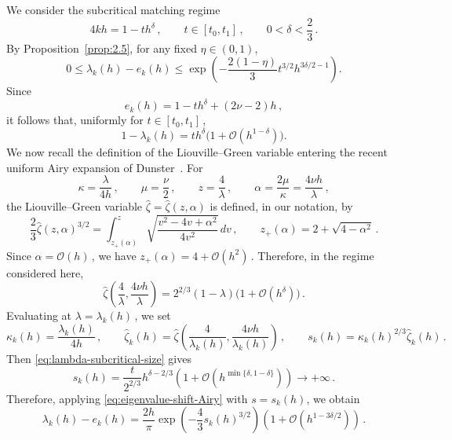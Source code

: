 \documentclass[11pt]{amsart}
\numberwithin{equation}{section}
\theoremstyle{remark}
\begin{document}
We consider the subcritical matching regime 
\begin{equation}\label{eq:subcritical-matching-regime}
	4kh=1-th^\delta\,,
	\qquad
	t\in[t_0,t_1]\,,
	\qquad
	0<\delta<\frac23\,.
\end{equation}
By Proposition~\ref{prop:2.5}, for any fixed $\eta\in(0,1)$,
\[
0\leq \lambda_k(h)-e_k(h)
\leq
\exp\left(
-\frac{2(1-\eta)}{3}
t^{3/2}h^{3\delta/2-1}
\right).
\]
Since
\[
e_k(h)=1-th^\delta+(2\nu-2)h\,,
\]
it follows that, uniformly for $t\in[t_0,t_1]\,$,
\begin{equation}\label{eq:lambda-subcritical-size}
	1-\lambda_k(h)
	=
	th^\delta\bigl(1+\mathcal O(h^{1-\delta})\bigr).
\end{equation}
We now recall the definition of the Liouville--Green variable entering the recent
uniform Airy expansion of Dunster~\cite{Dunster2026}. For
\[
\kappa=\frac{\lambda}{4h}\,,
\qquad
\mu=\frac{\nu}{2}\,,
\qquad
z=\frac4\lambda\,,
\qquad
\alpha=\frac{2\mu}{\kappa}
=\frac{4\nu h}{\lambda}\,,
\]
the Liouville--Green variable $\widehat\zeta=\widehat\zeta(z,\alpha)$
is defined, in our notation, by
\begin{equation}\label{eq:LG-zeta-definition}
	\frac23\widehat\zeta(z,\alpha)^{3/2}
	=
	\int_{z_+(\alpha)}^{z}
	\sqrt{\frac{v^2-4v+\alpha^2}{4v^2}}\,dv\,,
	\qquad
	z_+(\alpha)=2+\sqrt{4-\alpha^2}\,.
\end{equation}
Since $\alpha=\mathcal O(h)\,$, we have
$z_+(\alpha)=4+\mathcal O(h^2)\,$. Therefore, in the regime considered here,
\[
\widehat\zeta\left(\frac4\lambda,\frac{4\nu h}{\lambda}\right)
=
2^{2/3}(1-\lambda)
\bigl(1+\mathcal O(h^\delta)\bigr)\,.
\]
Evaluating at $\lambda=\lambda_k(h)\,$, we set
\[
\kappa_k(h)=\frac{\lambda_k(h)}{4h}\,,
\qquad
\widehat\zeta_k(h)
=
\widehat\zeta\left(
\frac4{\lambda_k(h)},
\frac{4\nu h}{\lambda_k(h)}
\right)\,,
\qquad
s_k(h)=\kappa_k(h)^{2/3}\widehat\zeta_k(h)\,.
\]
Then \eqref{eq:lambda-subcritical-size} gives
\begin{equation}\label{eq:sk-subcritical-size}
	s_k(h)
	=
	\frac{t}{2^{2/3}}h^{\delta-2/3}
	\left(1+\mathcal O\left(
	h^{\min\{\delta,1-\delta\}}\right)\right)
	\longrightarrow+\infty\,.
\end{equation}
Therefore, applying \eqref{eq:eigenvalue-shift-Airy} with
$s=s_k(h)$, we obtain
\begin{equation}\label{eq:eigenvalue-shift-subcritical}
	\lambda_k(h)-e_k(h)
	=
	\frac{2h}{\pi}
	\exp\left(-\frac43s_k(h)^{3/2}\right)
	\left(1+\mathcal O(h^{1-3\delta/2})\right)\,.
\end{equation}
\end{document}
